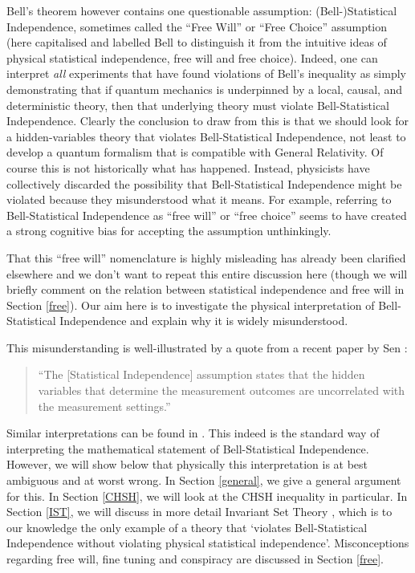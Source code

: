 \documentclass{article}
\begin{document}
Bell's theorem however contains one questionable assumption: (Bell-)Statistical Independence, sometimes called the ``Free Will'' or ``Free Choice'' assumption (here capitalised and labelled Bell to distinguish it from the intuitive ideas of physical statistical independence, free will and free  choice).
Indeed, one can interpret \emph{all} experiments that have found violations of Bell's inequality as simply demonstrating that if quantum mechanics is underpinned by a local, causal, and deterministic theory, then that underlying theory must violate Bell-Statistical Independence. Clearly the conclusion to draw from this is that we should look for a hidden-variables theory that violates Bell-Statistical Independence, not least to develop a quantum formalism that is compatible with General Relativity. 
Of course this is not historically what has happened. Instead, physicists have collectively discarded the possibility that Bell-Statistical Independence might be violated because they misunderstood what it means. For example, referring to Bell-Statistical Independence as ``free will'' or ``free choice'' seems to have created a strong cognitive bias for accepting the assumption unthinkingly. 

That this ``free will'' nomenclature is highly misleading has already been clarified elsewhere \cite{Hossenfelder2020Rethinking,Hossenfelder2020SuperdeterminismGuide} and we don't want to repeat this entire discussion here (though we will briefly comment on the relation between statistical independence and free will in Section \ref{free}). Our aim here is to investigate the physical interpretation of Bell-Statistical Independence and explain why it is widely misunderstood. 

This misunderstanding is well-illustrated by a quote from a recent paper by Sen \cite{sen2022analysis}:
\begin{quote}
``The [Statistical Independence] assumption states that the hidden variables that determine the measurement outcomes are uncorrelated with the measurement settings.''
\end{quote}
Similar interpretations can be found in \cite{Sen2020Superdet1,Sen2020Superdet2}. This indeed is the standard way of interpreting the mathematical statement of Bell-Statistical Independence. However, we will show below that physically this interpretation is at best ambiguous and at worst wrong. In Section \ref{general}, we give a general argument for this. In Section \ref{CHSH}, we will look at the {\sc CHSH} inequality in particular. In Section \ref{IST}, we will discuss in more detail Invariant Set Theory \cite{Palmer2020Discretization}, which is to our knowledge the only example of a theory that `violates Bell-Statistical Independence without violating physical statistical independence'. Misconceptions regarding free will, fine tuning and conspiracy are discussed in Section \ref{free}.
\end{document}
